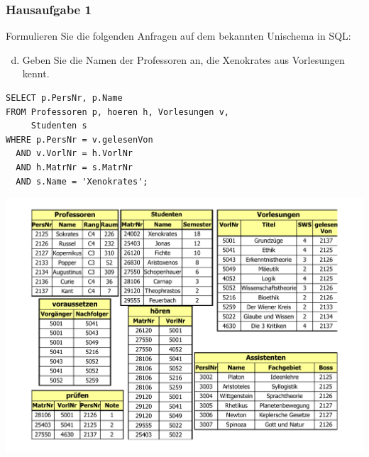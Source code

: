 \begin{frame}[fragile]
	\frametitle{Hausaufgabe 1}
	\vspace{0.25cm}

	\begin{multicols}{2}
		Formulieren Sie die folgenden Anfragen auf dem bekannten Unischema in SQL:
		\begin{enumerate}[a)]
			\setcounter{enumi}{3}
			\item Geben Sie die Namen der Professoren an, die Xenokrates aus Vorlesungen kennt.
		\end{enumerate}
		\begin{verbatim}
SELECT p.PersNr, p.Name
FROM Professoren p, hoeren h, Vorlesungen v,
	 Studenten s
WHERE p.PersNr = v.gelesenVon
  AND v.VorlNr = h.VorlNr
  AND h.MatrNr = s.MatrNr
  AND s.Name = 'Xenokrates';
		\end{verbatim}
		\vfill\columnbreak

		\begin{center}
			\includegraphics[height=.6\paperheight]{../img/uni.pdf}
		\end{center}
	\end{multicols}
\end{frame}

